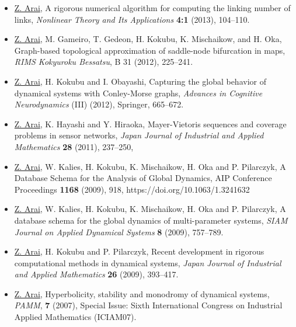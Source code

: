 \documentclass[11pt]{jsarticle}
\begin{document}
\begin{itemize}
\smallskip

\item[{\sf [8]}] 
{\underline{Z. Arai}}, 
{A rigorous numerical algorithm for computing the linking number of links},
{\it  Nonlinear Theory and Its Applications} {\bf 4:1} (2013), 104--110.

\smallskip

\item[{\sf [9]}] 
{\underline{Z. Arai}}, M. Gameiro, T. Gedeon, H. Kokubu, K. Mischaikow, and H. Oka, 
{Graph-based topological approximation of saddle-node bifurcation in maps}, 
{\it RIMS Kokyuroku Bessatsu}, B 31 (2012), 225--241.

\smallskip

\item[{\sf [10]}] 
    \underline{Z. Arai}, H. Kokubu and I. Obayashi, 
    Capturing the global behavior of dynamical systems with Conley-Morse graphs,
    {\it Advances in Cognitive Neurodynamics} (III) (2012), Springer, 665--672.

    \smallskip

\item[{\sf [11]}] 
{\underline{Z. Arai}, K. Hayashi and Y. Hiraoka}, 
{Mayer-Vietoris sequences and coverage problems in sensor networks},
{\it Japan Journal of Industrial and Applied Mathematics} {\bf 28} (2011), 237--250,

\smallskip
\item[{\sf [12]}] 
  \underline{Z. Arai}, W. Kalies, H. Kokubu, K. Mischaikow, H. Oka and P. Pilarczyk, 
  A Database Schema for the Analysis of Global Dynamics,
  AIP Conference Proceedings {\bf 1168} (2009), 918, https://doi.org/10.1063/1.3241632 

\smallskip

\item[{\sf [13]}] 
{\underline{Z. Arai}, W. Kalies, H. Kokubu, K. Mischaikow, H. Oka and P. Pilarczyk}, 
{A database schema for the global dynamics of multi-parameter systems},
{\it SIAM Journal on Applied Dynamical Systems}
{\bf 8} (2009), 757--789.

\smallskip

\item[{\sf [14]}] 
{\underline{Z. Arai}, H. Kokubu and P. Pilarczyk}, 
{Recent development in rigorous computational methods in dynamical systems},
{\it Japan Journal of Industrial and Applied Mathematics}
{\bf 26} (2009), 393--417.

\smallskip

\item[{\sf [15]}] 
\underline{Z. Arai}, 
Hyperbolicity, stability and monodromy of dynamical systems, 
{\it PAMM}, {\bf 7} (2007), 
Special Issue: Sixth International Congress on Industrial Applied Mathematics (ICIAM07).


\end{itemize}
\end{document}

